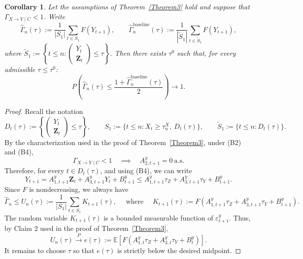 \documentclass[a4paper,11pt]{article}
\newtheorem{corollary}{Corollary}
\begin{document}
\begin{corollary}
\label{consequence_1+gamma/2}
Let the assumptions of Theorem~\ref{Theorem3} hold and suppose that
\(\Gamma_{X\to Y\mid C}<1\). Write 
\[
\widehat\Gamma_n(\tau)
:=
\frac1{|S_1|}\sum_{t\in S_1}F(Y_{t+1}),
\qquad
\widehat\Gamma^{\mathrm{baseline}}_n(\tau)
:=
\frac1{|\widetilde S_1|}
\sum_{t\in \widetilde S_1}F(Y_{t+1}), 
\]
where $\widetilde S_1:=\left\{t\leq n: \begin{pmatrix}Y_t\\ \mathbf Z_t\end{pmatrix}\le \tau\right\}.$ Then there exists \(\tau^0\) such that, for every admissible \(\tau\leq \tau^0\):
\[
P\left(
\widehat\Gamma_n(\tau)
\leq
\frac{1+\widehat\Gamma^{\mathrm{baseline}}_n(\tau)}{2}
\right)\to 1 .
\]
\end{corollary}
\begin{proof}
Recall the notation
\[
D_t(\tau):=\left\{\begin{pmatrix}Y_t\\ \mathbf Z_t\end{pmatrix}\le \tau\right\},
\qquad
S_1:=\{t\le n:X_t\ge \tau_n^X,\ D_t(\tau)\},
\qquad
\widetilde S_1:=\{t\le n:D_t(\tau)\}.
\]
By the characterization used in the proof of Theorem~\ref{Theorem3}, under
(B2) and (B4),
\[
\Gamma_{X\to Y\mid C}<1
\quad\implies \quad
A^y_{2,t+1}=0 \ \text{a.s.}
\]
Therefore, for every  \(t\in D_t(\tau)\), and using (B4), we can write
\[
Y_{t+1}=A^y_{1,t+1}\mathbf Z_t+A^y_{3,t+1}Y_t+B^y_{t+1}\le
A^y_{1,t+1}\tau_Z+A^y_{3,t+1}\tau_Y+B^y_{t+1}.
\]
Since \(F\) is nondecreasing, we always have
\[
\widehat\Gamma_n
\le
U_n(\tau)
:=
\frac1{|S_1|}\sum_{t\in S_1}
K_{t+1}(\tau), \quad \text{ where } \quad K_{t+1}(\tau)
:=
F\!\left(
A^y_{1,t+1}\tau_Z+A^y_{3,t+1}\tau_Y+B^y_{t+1}
\right).
\]
The random variable \(K_{t+1}(\tau)\) is a bounded measurable function of
\(\varepsilon^y_{t+1}\). Thus, by Claim 2 used in the
proof of Theorem~\ref{Theorem3},
\[
U_n(\tau)\overset{P}{\longrightarrow}
e(\tau)
:=
\mathbb E\!\left[
F\!\left(
A^y_{1,t}\tau_Z+A^y_{3,t}\tau_Y+B^y_t
\right)
\right].
\]
It remains to choose \(\tau\) so that \(e(\tau)\) is strictly below the desired midpoint. 


\end{proof}
\end{document}
